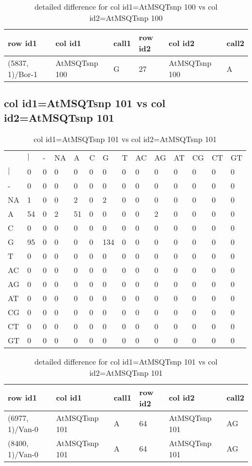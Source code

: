 \begin{center}
\begin{longtable}{|l|l|l|l|l|l|}
\caption{detailed difference for col id1=AtMSQTsnp 100 vs col id2=AtMSQTsnp 100} \label{table_dm691}\\
\hline
row id1&col id1&call1&row id2&col id2&call2\\
\hline
(5837, 1)/Bor-1&AtMSQTsnp 100&G&27&AtMSQTsnp 100&A\\
\hline
\end{longtable}
\end{center}

\subsection{col id1=AtMSQTsnp 101 vs col id2=AtMSQTsnp 101}
\begin{center}
\begin{longtable}{|l|l|l|l|l|l|l|l|l|l|l|l|l|l|}
\caption{col id1=AtMSQTsnp 101 vs col id2=AtMSQTsnp 101} \label{table_dm692}\\
\hline
\\
\hline
&$|$&-&NA&A&C&G&T&AC&AG&AT&CG&CT&GT\\
$|$&0&0&0&0&0&0&0&0&0&0&0&0&0\\
-&0&0&0&0&0&0&0&0&0&0&0&0&0\\
NA&1&0&0&2&0&2&0&0&0&0&0&0&0\\
A&54&0&2&51&0&0&0&0&2&0&0&0&0\\
C&0&0&0&0&0&0&0&0&0&0&0&0&0\\
G&95&0&0&0&0&134&0&0&0&0&0&0&0\\
T&0&0&0&0&0&0&0&0&0&0&0&0&0\\
AC&0&0&0&0&0&0&0&0&0&0&0&0&0\\
AG&0&0&0&0&0&0&0&0&0&0&0&0&0\\
AT&0&0&0&0&0&0&0&0&0&0&0&0&0\\
CG&0&0&0&0&0&0&0&0&0&0&0&0&0\\
CT&0&0&0&0&0&0&0&0&0&0&0&0&0\\
GT&0&0&0&0&0&0&0&0&0&0&0&0&0\\
\hline
\end{longtable}
\end{center}

\begin{center}
\begin{longtable}{|l|l|l|l|l|l|}
\caption{detailed difference for col id1=AtMSQTsnp 101 vs col id2=AtMSQTsnp 101} \label{table_dm693}\\
\hline
row id1&col id1&call1&row id2&col id2&call2\\
\hline
(6977, 1)/Van-0&AtMSQTsnp 101&A&64&AtMSQTsnp 101&AG\\
(8400, 1)/Van-0&AtMSQTsnp 101&A&64&AtMSQTsnp 101&AG\\
\hline
\end{longtable}
\end{center}

